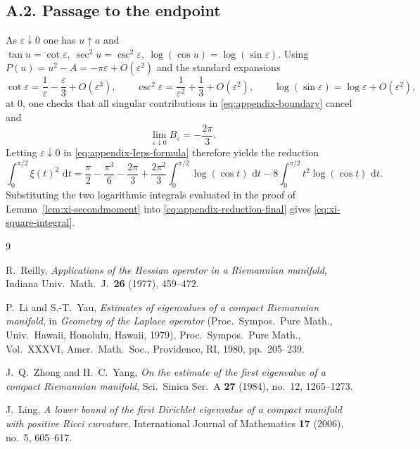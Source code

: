 \documentclass[11pt]{article}
\newcommand{\dd}{\,\mathrm{d}}
\begin{document}
\subsection*{A.2. Passage to the endpoint}
As $\varepsilon\downarrow 0$ one has $u\uparrow a$ and
\(
\tan u = \cot\varepsilon,\ \sec^2 u = \csc^2\varepsilon,\ \log(\cos u)=\log(\sin\varepsilon).
\)
Using $P(u)=u^2-A= -\pi\varepsilon+O(\varepsilon^2)$ and the standard expansions
\begin{equation}
	\cot\varepsilon = \frac{1}{\varepsilon}-\frac{\varepsilon}{3}+O(\varepsilon^3),
	\qquad
	\csc^2\varepsilon = \frac{1}{\varepsilon^2}+\frac{1}{3}+O(\varepsilon^2),
	\qquad
	\log(\sin\varepsilon)=\log\varepsilon+O(\varepsilon^2),
\end{equation}
at $0$, one checks that all singular contributions in \eqref{eq:appendix-boundary} cancel and
\begin{equation}
	\label{eq:appendix-boundary-limit}
	\lim_{\varepsilon\downarrow 0} B_{\varepsilon} = -\frac{2\pi}{3}.
\end{equation}
Letting $\varepsilon\downarrow 0$ in \eqref{eq:appendix-Ieps-formula} therefore yields the reduction
\begin{equation}
	\label{eq:appendix-reduction-final}
	\int_0^{\pi/2}\xi(t)^2\,\dd t
	= \frac{\pi}{2}-\frac{\pi^3}{6}-\frac{2\pi}{3}
	+ \frac{2\pi^2}{3}\int_0^{\pi/2}\log(\cos t)\,\dd t
	- 8\int_0^{\pi/2}t^2\log(\cos t)\,\dd t.
\end{equation}
Substituting the two logarithmic integrals evaluated in the proof of Lemma~\ref{lem:xi-secondmoment} into \eqref{eq:appendix-reduction-final} gives \eqref{eq:xi-square-integral}.


\newpage


\begin{thebibliography}{9}

R.~Reilly,
\emph{Applications of the Hessian operator in a Riemannian manifold},
Indiana Univ.\ Math.\ J.\ \textbf{26} (1977), 459--472.

P.~Li and S.-T.~Yau,
\emph{Estimates of eigenvalues of a compact Riemannian manifold},
in \emph{Geometry of the Laplace operator} (Proc.\ Sympos.\ Pure Math., Univ.\ Hawaii, Honolulu, Hawaii, 1979),
Proc.\ Sympos.\ Pure Math., Vol.\ XXXVI, Amer.\ Math.\ Soc., Providence, RI, 1980, pp.~205--239.

J.~Q.~Zhong and H.~C.~Yang,
\emph{On the estimate of the first eigenvalue of a compact Riemannian manifold},
Sci.\ Sinica Ser.\ A \textbf{27} (1984), no.\ 12, 1265--1273.

J.~Ling, \emph{A lower bound of the first Dirichlet eigenvalue of a compact manifold with positive Ricci curvature},
International Journal of Mathematics \textbf{17} (2006), no.~5, 605--617.


\end{thebibliography}
\end{document}
